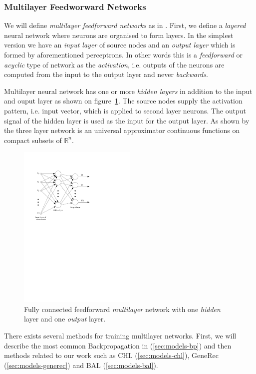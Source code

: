\subsubsection{Multilayer Feedworward Networks} 
\label{sec:theory-multilayer} 

We will define \emph{multilayer feedforward networks} as in \citet{haykin1994neural}. First, we define a \emph{layered} neural network where neurons are organised to form layers. In the simplest version we have an \emph{input layer} of source nodes and an \emph{output layer} which is formed by aforementioned perceptrons. In other words this is a \emph{feedforward} or \emph{acyclic} type of network as the \emph{activation}, i.e. outputs of the neurons are computed from the input to the output layer and never \emph{backwards}. 

Multilayer neural network has one or more \emph{hidden layers} in addition to the input and ouput layer as shown on figure~\ref{fig:multilayer}. The source nodes supply the activation pattern, i.e. input vector, which is applied to second layer neurons. The output signal of the hidden layer is used as the input for the output layer. As shown by \citet{cybenko1989approximation} the three layer network is an universal approximator continuous functions on compact subsets of $\mathbb{R}^n$.

\begin{figure}[H]
  \centering
  \includegraphics[width=0.5\textwidth]{img/multilayer.pdf}    
  \caption{Fully connected feedforward \emph{multilayer} network with one \emph{hidden} layer and one \emph{output} layer. } 
  \label{fig:multilayer}
\end{figure}

There exists several methods for training multilayer networks. First, we will describe the most common Backpropagation in (\ref{sec:models-bp}) and then methods related to our work such as CHL (\ref{sec:models-chl}), GeneRec (\ref{sec:models-generec}) and BAL (\ref{sec:models-bal}). 
